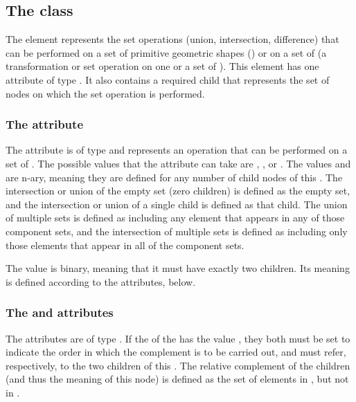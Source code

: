 

\subsection{The  class}
\label{csgsetoperator-class}
The \CSGSetOperator element represents the set operations (union, intersection, difference) that can be performed on a set of primitive geometric shapes (\CSGPrimitives) or on a set of \CSGNodes (a transformation or set operation on one or a set of \CSGPrimitives). This element has one attribute of type . It also contains a required child \ListOfCSGNodes that represents the set of nodes on which the set operation is performed.

\subsubsection{The \fixttspace{} attribute}
The  attribute is of type  and represents an operation that can be performed on a set of \CSGNodes. The possible values that the  attribute can take are , , or .  The values  and  are n-ary, meaning they are defined for any number of child nodes of this \CSGSetOperator.  The intersection or union of the empty set (zero children) is defined as the empty set, and the intersection or union of a single child is defined as that child.  The union of multiple sets is defined as including any element that appears in any of those component sets, and the intersection of multiple sets is defined as including only those elements that appear in all of the component sets.

The value  is binary, meaning that it must have exactly two children.  Its meaning is defined according to the  attributes, below.

\subsubsection{The \fixttspace{} and  attributes}
The  attributes are of type .  If the  of the \CSGSetOperator has the value , they both must be set to indicate the order in which the complement is to be carried out, and must refer, respectively, to the two  children of this \CSGSetOperator.  The relative complement of the children (and thus the meaning of this node) is defined as the set of elements in , but not in .  


